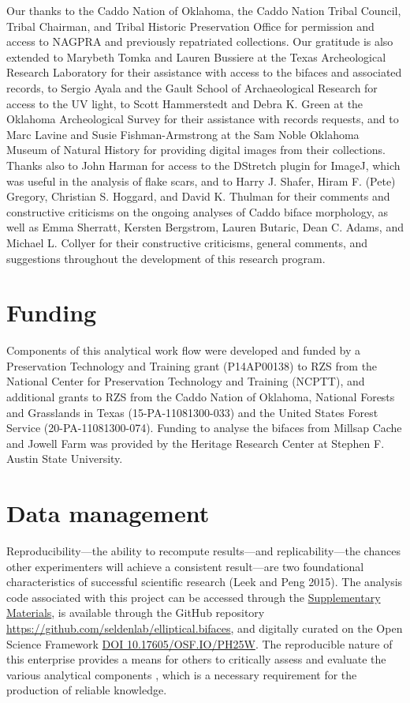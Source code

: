 \documentclass[]{interact}
\theoremstyle{plain}%
\theoremstyle{definition}
\theoremstyle{remark}
\begin{document}
Our thanks to the Caddo Nation of Oklahoma, the Caddo Nation Tribal
Council, Tribal Chairman, and Tribal Historic Preservation Office for
permission and access to NAGPRA and previously repatriated collections.
Our gratitude is also extended to Marybeth Tomka and Lauren Bussiere at
the Texas Archeological Research Laboratory for their assistance with
access to the bifaces and associated records, to Sergio Ayala and the
Gault School of Archaeological Research for access to the UV light, to
Scott Hammerstedt and Debra K. Green at the Oklahoma Archeological
Survey for their assistance with records requests, and to Marc Lavine
and Susie Fishman-Armstrong at the Sam Noble Oklahoma Museum of Natural
History for providing digital images from their collections. Thanks also
to John Harman for access to the DStretch plugin for ImageJ, which was
useful in the analysis of flake scars, and to Harry J. Shafer, Hiram F.
(Pete) Gregory, Christian S. Hoggard, and David K. Thulman for their
comments and constructive criticisms on the ongoing analyses of Caddo
biface morphology, as well as Emma Sherratt, Kersten Bergstrom, Lauren
Butaric, Dean C. Adams, and Michael L. Collyer for their constructive
criticisms, general comments, and suggestions throughout the development
of this research program.

\hypertarget{funding}{%
\section*{Funding}\label{funding}}

Components of this analytical work flow were developed and funded by a
Preservation Technology and Training grant (P14AP00138) to RZS from the
National Center for Preservation Technology and Training (NCPTT), and
additional grants to RZS from the Caddo Nation of Oklahoma, National
Forests and Grasslands in Texas (15-PA-11081300-033) and the United
States Forest Service (20-PA-11081300-074). Funding to analyse the
bifaces from Millsap Cache and Jowell Farm was provided by the Heritage
Research Center at Stephen F. Austin State University.

\hypertarget{data-management}{%
\section{Data management}\label{data-management}}

Reproducibility---the ability to recompute results---and
replicability---the chances other experimenters will achieve a
consistent result---are two foundational characteristics of successful
scientific research (Leek and Peng 2015). The analysis code associated
with this project can be accessed through the
\href{https://seldenlab.github.io/elliptical.bifaces/}{Supplementary
Materials}, is available through the GitHub repository
\url{https://github.com/seldenlab/elliptical.bifaces}, and digitally
curated on the Open Science Framework \href{https://osf.io/ph25w/}{DOI
10.17605/OSF.IO/PH25W}. The reproducible nature of this enterprise
provides a means for others to critically assess and evaluate the
various analytical components \citep{RN7434,RN7435,RN7427}, which is a
necessary requirement for the production of reliable knowledge.
\end{document}
